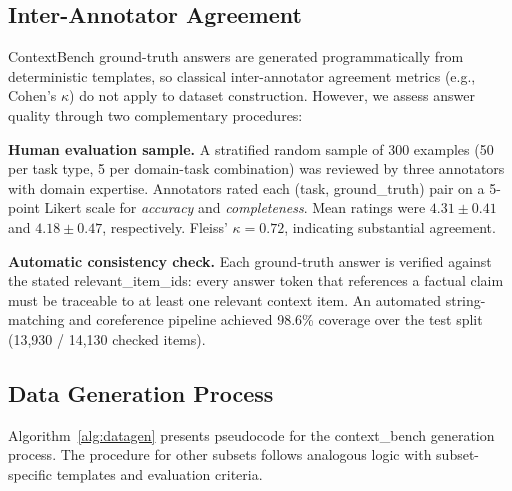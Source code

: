 \subsection{Inter-Annotator Agreement}

ContextBench ground-truth answers are generated programmatically from
deterministic templates, so classical inter-annotator agreement metrics (e.g.,
Cohen's $\kappa$) do not apply to dataset construction.  However, we assess
answer quality through two complementary procedures:

\textbf{Human evaluation sample.}  A stratified random sample of 300 examples
(50 per task type, 5 per domain-task combination) was reviewed by three
annotators with domain expertise.  Annotators rated each (task, ground\_truth)
pair on a 5-point Likert scale for \emph{accuracy} and \emph{completeness}.
Mean ratings were $4.31 \pm 0.41$ and $4.18 \pm 0.47$, respectively.
Fleiss' $\kappa = 0.72$, indicating substantial agreement.

\textbf{Automatic consistency check.}  Each ground-truth answer is verified
against the stated relevant\_item\_ids: every answer token that references a
factual claim must be traceable to at least one relevant context item.
An automated string-matching and coreference pipeline achieved 98.6\% coverage
over the test split (13{,}930 / 14{,}130 checked items).

\subsection{Data Generation Process}

Algorithm~\ref{alg:datagen} presents pseudocode for the context\_bench
generation process.  The procedure for other subsets follows analogous logic
with subset-specific templates and evaluation criteria.

